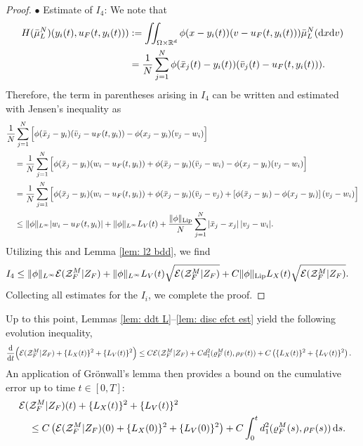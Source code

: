 \documentclass[10pt, reqno]{amsart}
\theoremstyle{definition}
\theoremstyle{remark}
\numberwithin{equation}{section}
\newcommand{\dx}{\textnormal{d}x}
\newcommand{\dv}{\textnormal{d}v}
\newcommand{\ds}{\textnormal{d}s}
\newcommand{\ddt}{\frac{\textnormal{d}}{\textnormal{d}t}}
\newcommand{\calE}{\mathcal E}
\newcommand{\calZ}{\mathcal Z}
\newcommand{\R}{\mathbb{R}}
\begin{document}
\begin{proof}
$\bullet$ Estimate of $I_4$: We note that
\begin{align*}
    H(\bar\mu_L^N)(y_i(t),u_F(t,y_i(t))) &:= \iint_{\Omega\times\R^d} \phi(x-y_i(t))(v-u_F(t,y_i(t))) \bar\mu_L^N(\dx\dv) \\
    &= \frac{1}{N}\sum_{j=1}^N \phi(\bar x_j(t) - y_i(t)) (\bar{v}_j(t) - u_F(t,y_i(t)) ). 
\end{align*}
Therefore, the term in parentheses arising in $I_4$ can be written and estimated with Jensen's inequality as
\begin{align*}
    &\frac{1}{N}\sum_{j=1}^N \Big[ \phi(\bar x_j - y_i) (\bar{v}_j - u_F(t,y_i) ) - \phi(x_j-y_i)(v_j-w_i) \Big]\\
    &\quad = \frac{1}{N}\sum_{j=1}^N \Big[ \phi(\bar x_j - y_i) (w_i - u_F(t,y_i)) + \phi(\bar x_j - y_i)(\bar v_j - w_i)  - \phi(x_j-y_i)(v_j-w_i) \Big] \\
    &\quad = \frac{1}{N} \sum_{j=1}^N \Big[ \phi(\bar x_j - y_i) (w_i - u_F(t,y_i)) + \phi(\bar x_j - y_i)(\bar v_j-v_j)  + \left[\phi(\bar x_j - y_i) - \phi(x_j-y_i) \right] (v_j - w_i) \Big]\\
    &\quad \le   \|\phi\|_{L^\infty} |w_i - u_F(t,y_i)|  + \|\phi\|_{L^\infty} L_V(t) + \frac{\|\phi\|_{\rm Lip}}{N}\sum_{j=1}^N |\bar x_j - x_j| \, |v_j- w_i|. 
\end{align*}
Utilizing this and Lemma \ref{lem: l2 bdd}, we find  
\begin{align*}
    I_4 &\le \|\phi\|_{L^\infty}\calE(\calZ_F^M|Z_F) + \|\phi\|_{L^\infty} L_V(t) \sqrt{\calE(\calZ_F^M| Z_F)}   + C\|\phi\|_{\rm Lip}L_X(t) \sqrt{\calE(\calZ_F^M|Z_F)}.
\end{align*}
Collecting all estimates for the $I_i$, we complete the proof.
\end{proof}


Up to this point, Lemmas \ref{lem: ddt L}--\ref{lem: disc efct est} yield the following evolution inequality,
\begin{align*}
    &\ddt \Big(\calE(\calZ_F^M| Z_F) + \{L_X(t)\}^2 + \{L_V(t)\}^2 \Big)  \le C \calE(\calZ_F^M| Z_F) + C d_{1}^2(\varrho_F^M(t),\rho_F(t)) + C\left(\{L_X(t)\}^2 + \{L_V(t)\}^2 \right).
\end{align*}
An application of Gr\"onwall's lemma then provides a bound on the cumulative error up to time $t \in [0,T]$:
\begin{equation}\label{eq: prerestore}
\begin{split}
    &\calE(\calZ_F^M| Z_F)(t) + \{L_X(t)\}^2 + \{L_V(t)\}^2  \\
    &\quad \le C \left(\calE(\calZ_F^M| Z_F)(0) + \{L_X(0)\}^2 + \{L_V(0)\}^2\right) + C \int_0^t d_{1}^2(\varrho_F^M(s),\rho_F(s)) \,\ds. 
\end{split}
\end{equation}
\end{document}
